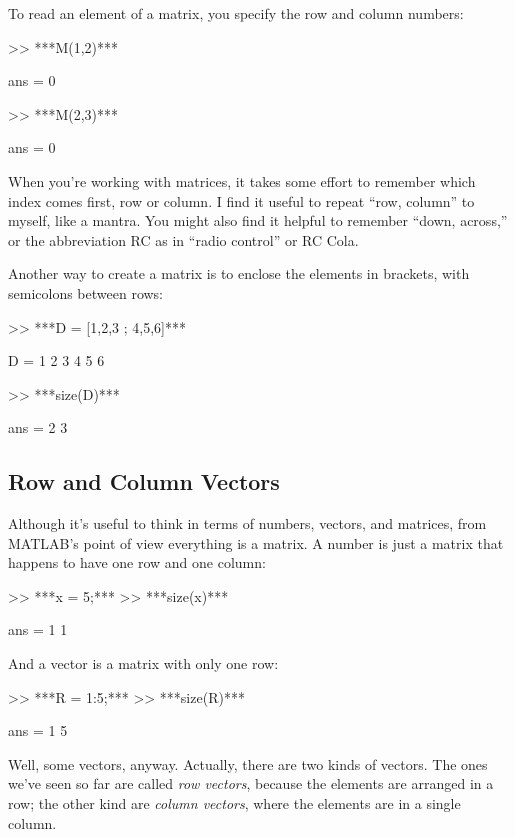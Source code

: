 
To read an element of a matrix, you specify the row and column numbers:

\begin{code}
>> ***M(1,2)***

ans = 0

>> ***M(2,3)***

ans = 0
\end{code}

When you're working with matrices, it takes some effort to remember
which index comes first, row or column.  I find it useful to repeat
``row, column'' to myself, like a mantra.  You might also find it
helpful to remember ``down, across,'' or the abbreviation RC as in ``radio control'' or RC Cola.

Another way to create a matrix is to enclose the elements in
brackets, with semicolons between rows:

\begin{code}
>> ***D = [1,2,3 ; 4,5,6]***

D =  1     2     3
     4     5     6

>> ***size(D)***

ans = 2     3
\end{code}


\subsection{Row and Column Vectors}
\label{rowvector}


Although it's useful to think in terms of numbers, vectors, and matrices,
from MATLAB's point of view everything is a matrix.  A number
is just a matrix that happens to have one row and one column:

\begin{code}
>> ***x = 5;***
>> ***size(x)***

ans = 1     1
\end{code}

And a vector is a matrix with only one row:

\begin{code}
>> ***R = 1:5;***
>> ***size(R)***

ans = 1     5
\end{code}

Well, some vectors, anyway.  Actually, there are two kinds
of vectors.  The ones we've seen so far are called {\em row vectors},
because the elements are arranged in a row; the other kind are
{\em column vectors}, where the elements are in a single column.

